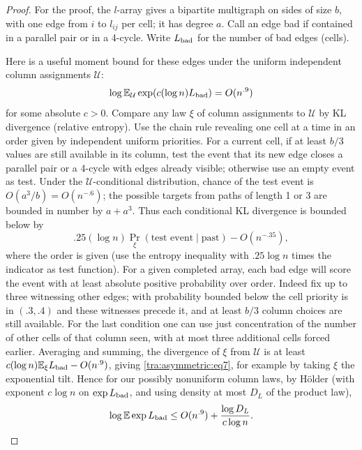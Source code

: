 \begin{proof}\label{tra:asymmetric:compatibility-proof}
\label{tra:asymmetric:short-cycle-and-matching-entropy}
For the proof, the \(l\)-array gives a bipartite multigraph on sides of size \(b\), with one edge from \(i\) to \(l_{ij}\) per cell; it has degree \(a\). Call an edge bad if contained in a parallel pair or in a 4-cycle. Write \(L_{\rm bad}\) for the number of bad edges (cells).

Here is a useful moment bound for these edges under the uniform independent column assignments \(\mathcal U\):
\begin{equation}
        \log\mathbb E_{\mathcal U}\exp(c(\log n)L_{\rm bad})
                                      = O(n^{.9})
                       \label{tra:asymmetric:eq7}
\end{equation}
for some absolute \(c>0\). Compare any law \(\xi\) of column assignments to \(\mathcal U\) by KL divergence (relative entropy). Use the chain rule revealing one cell at a time in an order given by independent uniform priorities. For a current cell, if at least \(b/3\) values are still available in its column, test the event that its new edge closes a parallel pair or a 4-cycle with edges already visible; otherwise use an empty event as test. Under the \(\mathcal U\)-conditional distribution, chance of the test event is \(O(a^3/b)=O(n^{-.6})\); the possible targets from paths of length 1 or 3 are bounded in number by \(a+a^3\). Thus each conditional KL divergence is bounded below by
\[
           .25(\log n)\Pr_{\xi}(\text{test event}\mid\text{past})-O(n^{-.35}),
\]
where the order is given (use the entropy inequality with \(.25\log n\) times the indicator as test function). For a given completed array, each bad edge will score the event with at least absolute positive probability over order. Indeed fix up to three witnessing other edges; with probability bounded below the cell priority is in \((.3,.4)\) and these witnesses precede it, and at least \(b/3\) column choices are still available. For the last condition one can use just concentration of the number of other cells of that column seen, with at most three additional cells forced earlier. Averaging and summing, the divergence of \(\xi\) from \(\mathcal U\) is at least \(c(\log n)\mathbb E_\xi L_{\rm bad}-O(n^{.9})\), giving \eqref{tra:asymmetric:eq7}, for example by taking \(\xi\) the exponential tilt. Hence for our possibly nonuniform column laws, by Hölder (with exponent \(c\log n\) on \(\exp L_{\rm bad}\), and using density at most \(D_L\) of the product law),
\begin{equation}
             \log\mathbb E\exp L_{\rm bad}
                         \le O(n^{.9}) + \frac{\log D_L}{c\log n}.
                       \label{tra:asymmetric:eq8}
\end{equation}


\end{proof}
